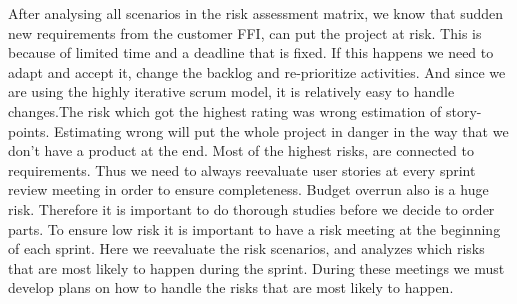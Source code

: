 After analysing all scenarios in the risk assessment matrix, we know that sudden new requirements from the customer FFI, can put the project at risk. This is because of limited time and a deadline that is fixed. If this happens we need to adapt and accept it, change the backlog and re-prioritize activities. And since we are using the highly iterative scrum model, it is relatively easy to handle changes.The risk which got the highest rating was wrong estimation of story-points. Estimating wrong will put the whole project in danger in the way that we don't have a product at the end. Most of the highest risks, are connected to requirements. Thus we need to always reevaluate user stories at every sprint review meeting in order to ensure completeness. Budget overrun also is a huge risk. Therefore it is important to do thorough studies before we decide to order parts.\newline \newline
To ensure low risk it is important to have a risk meeting at the beginning of each sprint. Here we reevaluate the risk scenarios, and analyzes which risks that are most likely to happen during the sprint. During these meetings we must develop plans on how to handle the risks that are most likely to happen.